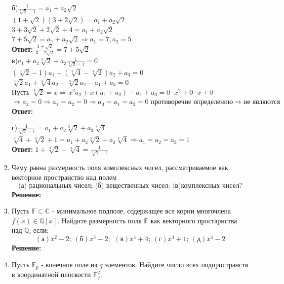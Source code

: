 \documentclass[]{book}
\theoremstyle{definition}
\newcommand{\bb}[1]{\mathbb{#1}}
\begin{document}
\begin{enumerate}[resume]
б)$\frac{1}{\sqrt[3]{2}-1} = a_1 +a_2\sqrt{2}$\\
$(1+\sqrt{2})(3+2\sqrt{2}) = a_1+a_2\sqrt{2} $\\
$3+ 3\sqrt{2}+2\sqrt{2}+4 = a_1+a_2\sqrt{2} $\\
$7+5\sqrt{2} = a_1+a_2\sqrt{2} \Longrightarrow a_1 = 7, a_2 = 5$\\

\textbf{Ответ: }$\frac{1+\sqrt{2}}{3-2\sqrt{2}} = 7+5\sqrt{2}$\\

в)$a_1+a_2\sqrt[3]{2}+a_3\frac{1}{\sqrt[3]{2}-1} = 0$\\
$(\sqrt[3]{2}-1)a_1 + (\sqrt[3]{4}-\sqrt[3]{2})a_2 + a_3 = 0 $\\
$\sqrt[3]{2}a_1 + \sqrt[3]{4}a_2 - \sqrt[3]{2}a_2 -a_1+a_3=0$\\
Пусть $\sqrt[3]{2} =x \Longrightarrow x^2 a_2 + x(a_1+a_2)-a_1+a_3=0\cdot x^2 + 0\cdot x+ 0$
$\Longrightarrow a_2 = 0
\Longrightarrow a_1=a_2=0
\Longrightarrow a_3=a_1=a_2=0 \text{ противоречие определению} \Longrightarrow \text{не являются}$\\
\textbf{Ответ: }

г)$\frac{1}{\sqrt[3]{2}-1} = a_1 + a_2\sqrt[3]{2}+a_3\sqrt[3]{4}$\\
$\sqrt[3]{4}+\sqrt[3]{2}+1 = a_1+a_2\sqrt[3]{2}+a_3\sqrt[3]{4} \Longrightarrow a_1=a_2=a_3 = 1$\\
\textbf{Ответ: } $1+\sqrt[3]{2}+\sqrt[3]{4} = \frac{1}{\sqrt[3]{2}-1}$\\



\item Чему равна размерность поля комплексных чисел, рассматриваемое как векторное пространство над полем
$$\text{(а) рациональных чисел; (б) вещественных чисел; (в)комплексных чисел?}$$
\textbf{Решение:}




\item Пусть  $\bb{F}\subset\mathbb{C}$ - минимальное подполе, содержащее все корни многочлена $f(x)\in\bb{Q}[x]$. Найдите размерность поля $\bb{F}$ как векторного простарнства над $\bb{Q}$, если:
$$ (\text{а}) x^2-2; \ (\text{б}) x^3-2; \  \ (\text{в}) x^4+4; \ (\text{г}) x^4+1; \ (\text{д}) x^4-2$$
\textbf{Решение:}







\item Пусть $\bb{F}_p$ - конечное поле из $q$ элементов. Найдите число всех подпространств в координатной плоскости $\bb{F}^2_q$.


\end{enumerate}
\end{document}
